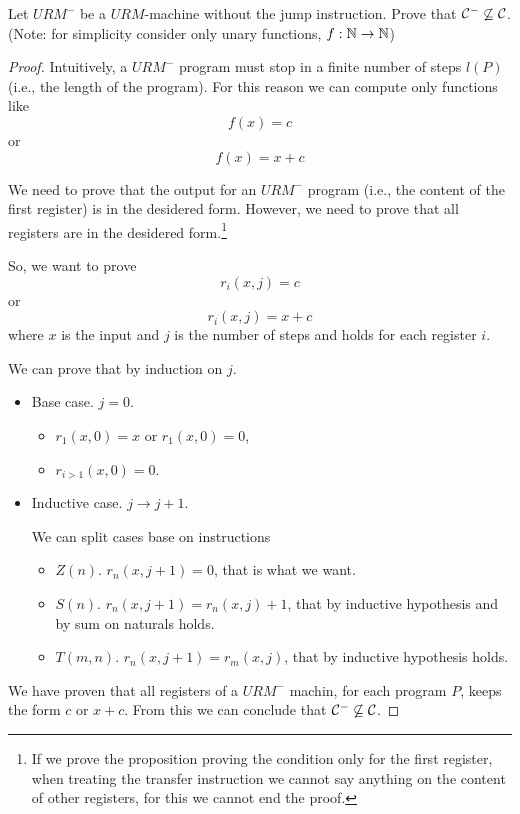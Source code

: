 \documentclass[12pt,a4paper,oneside]{book}
\begin{document}
\begin{exercise}
    Let $URM^-$ be a $URM$-machine without the jump instruction.
    Prove that $\mathcal{C}^- \not\subseteq \mathcal{C}$. (Note: for simplicity consider only unary functions, $f: \mathbb{N} \to \mathbb{N}$)
    
    \begin{proof}
        Intuitively, a $URM^-$ program must stop in a finite number of steps $l(P)$ (i.e., the length of the program).
        For this reason we can compute only functions like
        \[
        f(x) = c
        \]
        or
        \[
        f(x) = x + c
        \]
        
        We need to prove that the output for an $URM^-$ program (i.e., the content of the first register) is in the desidered form.
        However, we need to prove that all registers are in the desidered form.\footnote{If we prove the proposition proving the condition only for the first register, when treating the transfer instruction we cannot say anything on the content of other registers, for this we cannot end the proof.}
        
        So, we want to prove
        \[ r_i(x, j) = c \]
        or
        \[ r_i(x, j) = x + c \]
        where $x$ is the input and $j$ is the number of steps and holds for each register $i$.
        
        We can prove that by induction on $j$.
        
        \begin{itemize}
            \item Base case. $j = 0$. 
            \begin{itemize}
                \item $r_1(x, 0) = x$ or $r_1(x, 0) = 0$,
                \item $r_{i > 1} (x, 0) = 0$.
            \end{itemize}
            
            \item Inductive case. $j \to j + 1$.
            
            We can split cases base on instructions
            \begin{itemize}
                \item $Z(n)$. $r_n(x, j+1) = 0$, that is what we want.
                \item $S(n)$. $r_n(x, j+1) = r_n(x, j) + 1$, that by inductive hypothesis and by sum on naturals holds.
                \item $T(m, n)$. $r_n(x, j + 1) = r_m(x, j)$, that by inductive hypothesis holds.
            \end{itemize}
        \end{itemize}
        
        We have proven that all registers of a $URM^-$ machin, for each program $P$, keeps the form $c$ or $x + c$. From this we can conclude that $\mathcal{C}^- \not\subseteq \mathcal{C}$.
    \end{proof}
    
\end{exercise}
\end{document}
